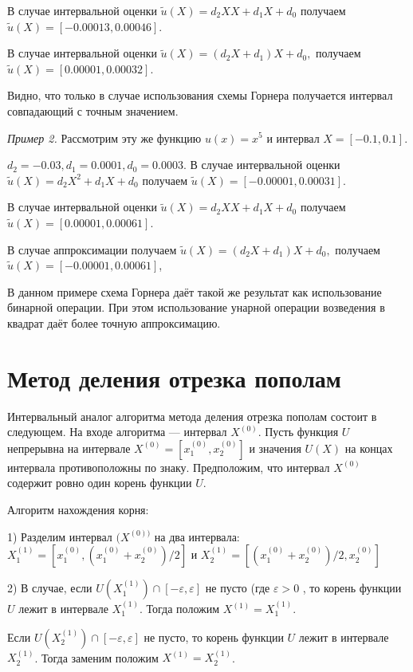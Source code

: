 \documentclass{spisok-article}
\begin{document}
В случае интервальной оценки  $\widetilde{u}(X)=d_2XX+d_1X+d_0$ получаем
$\widetilde{u}(X)=[-0.00013,0.00046]$.


В случае интервальной оценки  $\widetilde{u}(X)=(d_2X+d_1)X+d_0,$ получаем
$\widetilde{u}(X)=[0.00001,0.00032]$.

Видно, что только в случае использования схемы Горнера
получается интервал совпадающий с точным значением.

\bigskip
{\it Пример 2.} Рассмотрим эту же функцию $u(x)=x^5$ и интервал $X=[-0.1, 0.1]$.



$d_2 = -0.03,	d_1 = 0.0001, 	d_0 = 0.0003$.
В случае интервальной оценки  $\widetilde{u}(X)=d_2X^2+d_1X+d_0$ получаем
$\widetilde{u}(X)=[-0.00001, 0.00031]$.

В случае интервальной оценки  $\widetilde{u}(X)=d_2XX+d_1X+d_0$ получаем
$\widetilde{u}(X)=[0.00001,0.00061]$.


В случае аппроксимации получаем  $\widetilde{u}(X)=(d_2X+d_1)X+d_0,$ получаем
$\widetilde{u}(X)=[-0.00001,0.00061]$,


В данном примере схема Горнера даёт такой же результат как использование бинарной операции.
При этом использование унарной операции возведения в квадрат даёт более точную аппроксимацию.


\section{Метод деления отрезка пополам}

Интервальный аналог  алгоритма метода деления отрезка пополам состоит в следующем. На входе алгоритма --- интервал  $X^{(0)}$.
Пусть функция $U$ непрерывна на интервале $X^{(0)}=[x_1^{(0)}, x_2^{(0)}]$
  и значения $U(X)$ на концах интервала противоположны по знаку.
Предположим, что интервал $X^{(0)}$ содержит ровно один корень функции $U$.

 Алгоритм нахождения корня:

1) Разделим интервал $(X^{(0))}$ на два интервала:
	 $X_1^{(1)}=[x_1^{(0)}, (x_1^{(0)}+x_2^{(0)})/2]$ и $X_2^{(1)}=[(x_1^{(0)}+x_2^{(0)})/2, x_2^{(0)}]$

2) В случае, если  $U(X_1^{(1)})\cap [-\varepsilon,\varepsilon]$ не пусто
 (где $\varepsilon>0$  , то корень функции $U$
  лежит в интервале $X_1^{(1)}$. Тогда положим $X^{(1)}=X_1^{(1)}$.

Если  $U(X_2^{(1)})\cap [-\varepsilon,\varepsilon]$ не пусто, то корень функции $U$
лежит в интервале $X_2^{(1)}$. Тогда заменим  положим $X^{(1)}=X_2^{(1)}$.
\end{document}
